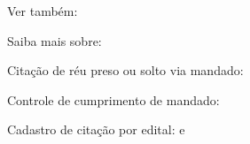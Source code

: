 \documentclass[letterpaper,10pt,brazil]{sphinxmanual}
\begin{document}
\begin{sphinxseealso}{Ver também:}

\sphinxAtStartPar
Saiba mais sobre:

\sphinxAtStartPar
Citação de réu preso ou solto via mandado: {\hyperref[\detokenize{projud_32_expedicaomandado::doc}]{}}

\sphinxAtStartPar
Controle de cumprimento de mandado: {\hyperref[\detokenize{projud_59_juntadahabeascorpus::doc}]{}}

\sphinxAtStartPar
Cadastro de citação por edital: {\hyperref[\detokenize{projud_44_cartaprecatoriaeletronica::doc}]{}} e {\hyperref[\detokenize{projud_33_ordenarcumprimento::doc}]{}}


\end{sphinxseealso}
\end{document}
